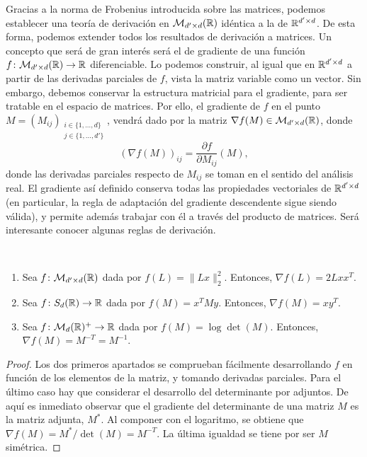Gracias a la norma de Frobenius introducida sobre las matrices, podemos establecer una teoría de derivación en $\mathcal{M}_{d' \times d}(\mathbb{R})$ idéntica a la de $\mathbb{R}^{d'\times d}$. De esta forma, podemos extender todos los resultados de derivación a matrices. Un concepto que será de gran interés será el de gradiente de una función $f \colon \mathcal{M}_{d' \times d}(\mathbb{R}) \to \mathbb{R}$ diferenciable. Lo podemos construir, al igual que en $\mathbb{R}^{d'\times d}$ a partir de las derivadas parciales de $f$, vista la matriz variable como un vector. Sin embargo, debemos conservar la estructura matricial para el gradiente, para ser tratable en el espacio de matrices. Por ello, el gradiente de $f$ en el punto $M = (M_{ij})_{\substack{i \in \{1,\dots,d\}\\j \in \{1,\dots,d'\}}}$, vendrá dado por la matriz $\nabla f(M) \in \mathcal{M}_{d'\times d}(\mathbb{R})$, donde
\[ (\nabla f(M))_{ij} = \frac{\partial f}{\partial M_{ij}}(M), \]
donde las derivadas parciales respecto de $M_{ij}$ se toman en el sentido del análisis real. El gradiente así definido conserva todas las propiedades vectoriales de $\mathbb{R}^{d'\times d}$ (en particular, la regla de adaptación del gradiente descendente sigue siendo válida), y permite además trabajar con él a través del producto de matrices. Será interesante conocer algunas reglas de derivación.

\begin{prop}~
    \begin{enumerate}
        \item Sea $f \colon \mathcal{M}_{d' \times d}(\mathbb{R})$ dada por $f(L) = \|Lx\|_2^2$. Entonces, $\nabla f(L) = 2Lxx^T$.
        \item Sea $f \colon S_d(\mathbb{R}) \to \mathbb{R}$ dada por $f(M) = x^TMy$. Entonces, $\nabla f(M) = xy^T$.
        \item Sea $f \colon \mathcal{M}_d(\mathbb{R})^+ \to \mathbb{R}$ dada por $f(M) = \log\det(M)$. Entonces, $\nabla f(M) = M^{-T} = M^{-1}$.
    \end{enumerate}
\end{prop}

\begin{proof}
    Los dos primeros apartados se comprueban fácilmente desarrollando $f$ en función de los elementos de la matriz, y tomando derivadas parciales. Para el último caso hay que considerar el desarrollo del determinante por adjuntos. De aquí es inmediato observar que el gradiente del determinante de una matriz $M$ es la matriz adjunta, $M^*$. Al componer con el logaritmo, se obtiene que $\nabla f(M) = M^*/\det(M) = M^{-T}$. La última igualdad se tiene por ser $M$ simétrica.
\end{proof}